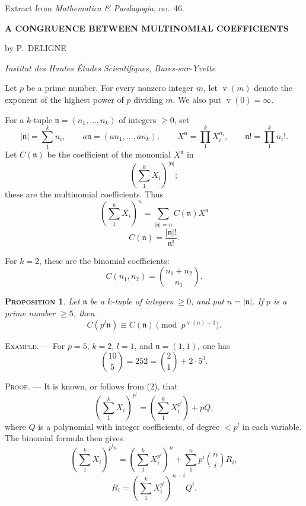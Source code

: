 \documentclass[12pt]{amsart}
\theoremstyle{plain}
\newtheorem{prop}{\textsc{Proposition}}
\DeclareMathOperator{\vord}{v}
\begin{document}
\begin{flushright}
\small Extract from \emph{Mathematica \& Paedagogia}, no.~46.
\end{flushright}

\begin{center}
\textbf{A CONGRUENCE BETWEEN MULTINOMIAL COEFFICIENTS}

\smallskip
\small by P.~DELIGNE

\smallskip
\footnotesize\textit{Institut des Hautes Études Scientifiques, Bures-sur-Yvette}
\end{center}

Let $p$ be a prime number. For every nonzero integer $m$, let $\vord(m)$ denote the exponent of the highest power of $p$ dividing $m$. We also put $\vord(0)=\infty$.

For a $k$-tuple $\mathfrak n=(n_1,\ldots,n_k)$ of integers $\geq 0$, set
\[
|\mathfrak n|=\sum_1^k n_i,\qquad
 a\mathfrak n=(an_1,\ldots,an_k),\qquad
 X^{\mathfrak n}=\prod_1^k X_i^{n_i},\qquad
 \mathfrak n!=\prod_1^k n_i!.
\]
Let $C(\mathfrak n)$ be the coefficient of the monomial $X^{\mathfrak n}$ in
\[
\left(\sum_1^k X_i\right)^{|\mathfrak n|};
\]
these are the multinomial coefficients. Thus
\begin{equation}
\left(\sum_1^k X_i\right)^n=\sum_{|\mathfrak n|=n} C(\mathfrak n)X^{\mathfrak n}
\end{equation}
\begin{equation}
C(\mathfrak n)=\frac{|\mathfrak n|!}{\mathfrak n!}.\tag{2}
\end{equation}

For $k=2$, these are the binomial coefficients:
\begin{equation}
C(n_1,n_2)=\binom{n_1+n_2}{n_1}.\tag{3}
\end{equation}

\begin{prop}
Let $\mathfrak n$ be a $k$-tuple of integers $\geq 0$, and put $n=|\mathfrak n|$. If $p$ is a prime number $\geq 5$, then
\begin{equation}
C(p^l\mathfrak n)\equiv C(\mathfrak n)\pmod {p^{\vord(n)+3}}.\tag{4}
\end{equation}
\end{prop}

\noindent\textsc{Example.} --- For $p=5$, $k=2$, $l=1$, and $\mathfrak n=(1,1)$, one has
\[
\binom{10}{5}=252=\binom{2}{1}+2\cdot 5^3.
\]

\medskip
\noindent\textsc{Proof.} --- It is known, or follows from (2), that
\begin{equation}
\left(\sum_1^k X_i\right)^{p^l}=\left(\sum_1^k X_i^{p^l}\right)+pQ,\tag{5}
\end{equation}
where $Q$ is a polynomial with integer coefficients, of degree $<p^l$ in each variable. The binomial formula then gives
\begin{equation}
\left(\sum_1^k X_i\right)^{p^l n}=\left(\sum_1^k X_i^{p^l}\right)^n+
\sum_1^n p^i\binom{n}{i}R_i,\tag{6}
\end{equation}
\begin{equation}
R_i=\left(\sum_1^k X_i^{p^l}\right)^{n-i}Q^i.\tag{7}
\end{equation}
\end{document}
